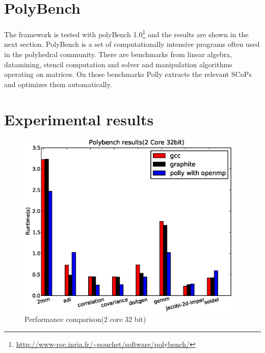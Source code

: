 \section{PolyBench}
The framework is tested with polyBench 1.0\footnote{\url{http://www-roc.inria.fr/~pouchet/software/polybench/}}
and the results are shown in the next section. PolyBench is a set of computationally intensive programs often
used in the polyhedral community. There are benchmarks from linear algebra, datamining, stencil computation
and solver and manipulation algorithms operating on matrices. On those benchmarks Polly extracts the relevant SCoPs and optimizes them automatically.

\section{Experimental results}
\begin{figure}
\begin{center}
  \includegraphics[height=9cm]{images/2core32bit.eps}
  \caption{Performance comparison(2 core 32 bit)}
  \label{fig:2core1}
\end{center}
\end{figure}

